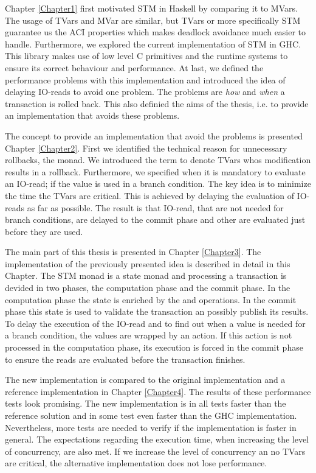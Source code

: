 Chapter \ref{Chapter1} first motivated STM in Haskell by comparing it to MVars. The usage of TVars 
and MVar are similar, but TVars or more specifically STM guarantee us the ACI properties which makes
deadlock avoidance much easier to handle. Furthermore, we explored the current implementation of STM
in GHC. This library makes use of low level C primitives and the runtime systems to ensure its 
correct behaviour and performance. At last, we defined the performance problems with this implementation
and introduced the idea of delaying IO-reads to avoid one problem. The problems are \textit{how} and 
\textit{when} a transaction is rolled back. This also definied the aims of the thesis, i.e. 
to provide an implementation that avoids these problems. 

The concept to provide an implementation that avoid the problems is presented Chapter \ref{Chapter2}.
First we identified the technical reason for unnecessary rollbacks, the monad. We introduced the term
 to denote TVars whos modification results in a rollback. Furthermore, we 
specified when it is mandatory to evaluate an IO-read; if the value is used in a branch condition.
The key idea is to minimize the time the TVars are critical. This is achieved by delaying the 
evaluation of IO-reads as far as possible. The result is that IO-read, that are not needed for branch 
conditions, are delayed to the commit phase and other are evaluated just before they are used.

The main part of this thesis is presented in Chapter \ref{Chapter3}. The implementation of the previously 
presented idea is described in detail in this Chapter. The STM monad is a state monad and processing a
transaction is devided in two phases, the computation phase and the commit phase. In the computation
phase the state is enriched by the  and  operations. In the commit phase 
this state is used to validate the transaction an possibly publish its results. To delay the execution 
of the IO-read and to find out when a value is needed for a branch condition, the values are wrapped 
by an  action. If this action is not processed in the computation phase, its 
execution is forced in the commit phase to ensure the reads are evaluated before the transaction 
finishes. 

The new implementation is compared to the original implementation and a reference implementation in
Chapter \ref{Chapter4}. The results of these performance tests look promising. The new implementation
is in all tests faster than the reference solution and in some test even faster than the GHC implementation.
Nevertheless, more tests are needed to verify if the implementation is faster in general. The expectations 
regarding the execution time, when increasing the level of concurrency, are also met. If we increase the 
level of concurrency an no TVars are critical, the alternative implementation does not lose performance.

